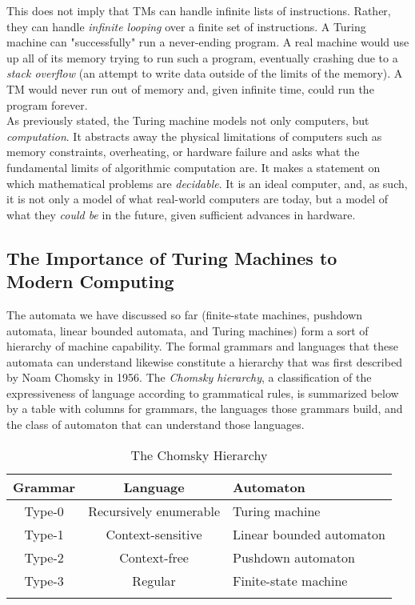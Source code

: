 This does not imply that TMs can handle infinite lists of instructions. Rather, they can handle \textit{infinite looping} over a finite set of instructions. A Turing machine can "successfully" run a never-ending program. A real machine would use up all of its memory trying to run such a program, eventually crashing due to a \textit{stack overflow} (an attempt to write data outside of the limits of the memory). A TM would never run out of memory and, given infinite time, could run the program forever. \\

As previously stated, the Turing machine models not only computers, but \textit{computation}. It abstracts away the physical limitations of computers such as memory constraints, overheating, or hardware failure and asks what the fundamental limits of algorithmic computation are. It makes a statement on which mathematical problems are \textit{decidable}. It is an ideal computer, and, as such, it is not only a model of what real-world computers are today, but a model of what they \textit{could be} in the future, given sufficient advances in hardware. \\


\subsection{The Importance of Turing Machines to Modern Computing}

The automata we have discussed so far (finite-state machines, pushdown automata, linear bounded automata, and Turing machines) form a sort of hierarchy of machine capability. The formal grammars and languages that these automata can understand likewise constitute a hierarchy that was first described by Noam Chomsky in 1956. The \textit{Chomsky hierarchy}, a classification of the expressiveness of language according to grammatical rules, is summarized below by a table with columns for grammars, the languages those grammars build, and the class of automaton that can understand those languages.

\begin{table}[H]
	\caption{The Chomsky Hierarchy}
	\label{tab:LABEL}
	\begin{tabularx}{\textwidth}{|c|c|Y|}
		\hline
		Grammar & Language & Automaton \\
		\hline
		Type-0 & Recursively enumerable & Turing machine \\
		Type-1 & Context-sensitive & Linear bounded automaton \\
		Type-2 & Context-free & Pushdown automaton \\
		Type-3 & Regular & Finite-state machine \\
		\hline
	\end{tabularx}
\end{table}

